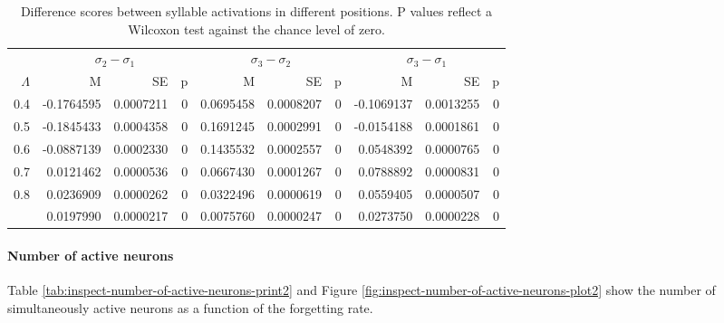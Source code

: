 \documentclass[
]{article}
\begin{document}
\begin{table}

\caption{\label{tab:basic-experiment-global-print-act-in-words-table2}Difference scores between syllable activations in different positions. P values reflect a Wilcoxon test against the chance level of zero.}
\centering
\begin{tabular}[t]{rrrrrrrrrr}
\toprule
\multicolumn{1}{c}{ } & \multicolumn{3}{c}{$\sigma_2 - \sigma_1$} & \multicolumn{3}{c}{$\sigma_3 - \sigma_2$} & \multicolumn{3}{c}{$\sigma_3 - \sigma_1$} \\
\cmidrule(l{3pt}r{3pt}){2-4} \cmidrule(l{3pt}r{3pt}){5-7} \cmidrule(l{3pt}r{3pt}){8-10}
$\Lambda$ & M & SE & p & M & SE & p & M & SE & p\\
\midrule
0.4 & -0.1764595 & 0.0007211 & 0 & 0.0695458 & 0.0008207 & 0 & -0.1069137 & 0.0013255 & 0\\
0.5 & -0.1845433 & 0.0004358 & 0 & 0.1691245 & 0.0002991 & 0 & -0.0154188 & 0.0001861 & 0\\
0.6 & -0.0887139 & 0.0002330 & 0 & 0.1435532 & 0.0002557 & 0 & 0.0548392 & 0.0000765 & 0\\
0.7 & 0.0121462 & 0.0000536 & 0 & 0.0667430 & 0.0001267 & 0 & 0.0788892 & 0.0000831 & 0\\
0.8 & 0.0236909 & 0.0000262 & 0 & 0.0322496 & 0.0000619 & 0 & 0.0559405 & 0.0000507 & 0\\
\addlinespace
0.9 & 0.0197990 & 0.0000217 & 0 & 0.0075760 & 0.0000247 & 0 & 0.0273750 & 0.0000228 & 0\\
\bottomrule
\end{tabular}
\end{table}

\clearpage

\hypertarget{number-of-active-neurons}{%
\paragraph{Number of active neurons}\label{number-of-active-neurons}}

Table \ref{tab:inspect-number-of-active-neurons-print2} and Figure
\ref{fig:inspect-number-of-active-neurons-plot2} show the number of
simultaneously active neurons as a function of the forgetting rate.
\end{document}
